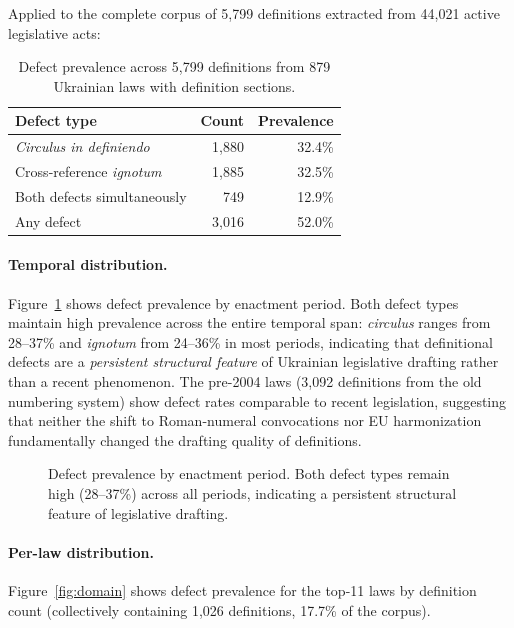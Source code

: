 \documentclass[11pt]{article}
\begin{document}
Applied to the complete corpus of 5{,}799 definitions extracted from 44{,}021 active legislative acts:

\begin{table}[t]
\centering
\caption{Defect prevalence across 5{,}799 definitions from 879 Ukrainian laws with definition sections.}
\label{tab:prevalence}
\begin{tabular}{lrr}
\toprule
\textbf{Defect type} & \textbf{Count} & \textbf{Prevalence} \\
\midrule
\emph{Circulus in definiendo} & 1{,}880 & 32.4\% \\
Cross-reference \emph{ignotum} & 1{,}885 & 32.5\% \\
Both defects simultaneously & 749 & 12.9\% \\
\midrule
Any defect & 3{,}016 & 52.0\% \\
\bottomrule
\end{tabular}
\end{table}

\paragraph{Temporal distribution.}
Figure~\ref{fig:temporal} shows defect prevalence by enactment period.
Both defect types maintain high prevalence across the entire temporal span: \emph{circulus} ranges from 28--37\% and \emph{ignotum} from 24--36\% in most periods, indicating that definitional defects are a \emph{persistent structural feature} of Ukrainian legislative drafting rather than a recent phenomenon.
The pre-2004 laws (3{,}092 definitions from the old numbering system) show defect rates comparable to recent legislation, suggesting that neither the shift to Roman-numeral convocations nor EU harmonization fundamentally changed the drafting quality of definitions.

\begin{figure}[t]
\centering

\caption{Defect prevalence by enactment period. Both defect types remain high (28--37\%) across all periods, indicating a persistent structural feature of legislative drafting.}
\label{fig:temporal}
\end{figure}

\paragraph{Per-law distribution.}
Figure~\ref{fig:domain} shows defect prevalence for the top-11 laws by definition count (collectively containing 1{,}026 definitions, 17.7\% of the corpus).
\end{document}
